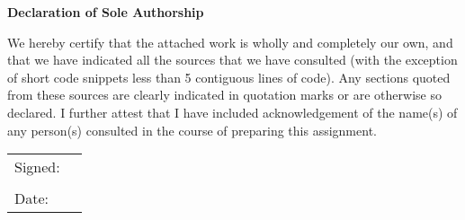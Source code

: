\documentclass[11pt,a4paper]{article}
\begin{document}
\begin{center}
\bfseries\huge Declaration of Sole Authorship
\end{center}
We hereby certify that the attached work is wholly and completely our own, and that we have indicated all the sources that we have consulted (with the exception of short code snippets less than 5 contiguous lines of code). Any sections quoted from these sources are clearly indicated in quotation marks or are otherwise so declared. I further attest that I have included acknowledgement of the name(s) of any person(s) consulted in the course of preparing this assignment.

\bigskip\bigskip

\begin{tabular}{@{}p{.5in}p{4in}@{}}
Signed: & \hrulefill \\
&\\
Date:&\\
\end{tabular}
\end{document}
